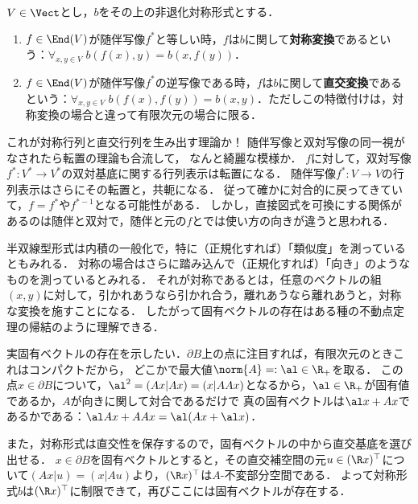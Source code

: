 \documentclass[uplatex, dvipdfmx]{jsreport}
\begin{document}
\begin{definition}
    $V\in\Vect$とし，$b$をその上の非退化対称形式とする．
    \begin{enumerate}
        \item $f\in\End(V)$が随伴写像$f^*$と等しい時，$f$は$b$に関して\textbf{対称変換}であるという：$\forall_{x,y\in V}\;b(f(x),y)=b(x,f(y))$．
        \item $f\in\End(V)$が随伴写像$f^*$の逆写像である時，$f$は$b$に関して\textbf{直交変換}であるという：$\forall_{x,y\in V}\;b(f(x),f(y))=b(x,y)$．ただしこの特徴付けは，対称変換の場合と違って有限次元の場合に限る．
    \end{enumerate}
\end{definition}
\begin{remark}[随伴と双対]
    これが対称行列と直交行列を生み出す理論か！
    随伴写像と双対写像の同一視がなされたら転置の理論も合流して，
    なんと綺麗な模様か．
    $f$に対して，双対写像$f^*:V^*\to V^*$の双対基底に関する行列表示は転置になる．
    随伴写像$f^*:V\to V$の行列表示はさらにその転置と，共軛になる．
    従って確かに対合的に戻ってきていて，$f=f^*$や$f^{*-1}$となる可能性がある．
    しかし，直接図式を可換にする関係があるのは随伴と双対で，随伴と元の$f$とでは使い方の向きが違うと思われる．
\end{remark}
\begin{remarks}[固有ベクトルの存在の幾何学的な理解]
    半双線型形式は内積の一般化で，特に（正規化すれば）「類似度」を測っているともみれる．
    対称の場合はさらに踏み込んで（正規化すれば）「向き」のようなものを測っているとみれる．
    それが対称であるとは，任意のベクトルの組$(x,y)$に対して，引かれあうなら引かれ合う，離れあうなら離れあうと，対称な変換を施すことになる．
    したがって固有ベクトルの存在はある種の不動点定理の帰結のように理解できる．

    実固有ベクトルの存在を示したい．$\partial B$上の点に注目すれば，有限次元のときこれはコンパクトだから，
    どこかで最大値$\norm{A}=:\al\in\R_+$を取る．
    この点$x\in\partial B$について，$\al^2=(Ax|Ax)=(x|AAx)$となるから，$\al\in\R_+$が固有値であるか，$A$が向きに関して対合であるだけで
    真の固有ベクトルは$\al x+Ax$であるかである：$\al Ax+AAx=\al(Ax+\al x)$．

    また，対称形式は直交性を保存するので，固有ベクトルの中から直交基底を選び出せる．
    $x\in\partial B$を固有ベクトルとすると，その直交補空間の元$u\in (\R x)^\top$について$(Ax|u)=(x|Au)$より，$(\R x)^\top$は$A$-不変部分空間である．
    よって対称形式$b$は$(\R x)^\top$に制限できて，再びここには固有ベクトルが存在する．
\end{remarks}
\end{document}
